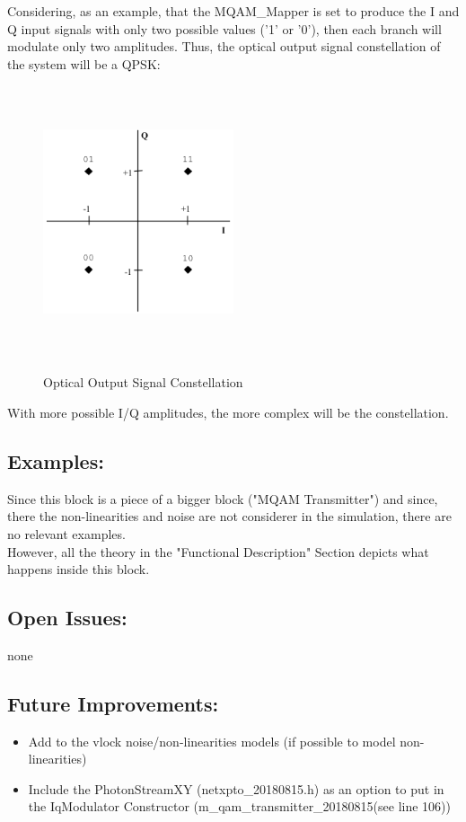 Considering, as an example, that the MQAM\_Mapper is set to produce the I and Q input signals with only  two possible values ('1' or '0'), then each branch will modulate only two amplitudes. Thus, the optical output signal constellation of the system will be a QPSK:
\begin{figure}[H]
	\centering
	\includegraphics[width=0.5\textwidth, height=8cm]{./lib/iq_modulator/figures/qpsk_constellation.png}
	\label{Optical Output Signal Constellation}\caption{Optical Output Signal Constellation}
\end{figure}
With more possible I/Q amplitudes, the more complex will be the constellation.
\subsection*{Examples:}
Since this block is a piece of a bigger block ("MQAM Transmitter") and since, there the non-linearities and noise are not considerer in the simulation, there are no relevant examples.\\
However, all the theory in the "Functional Description" Section depicts what happens inside this block.

\subsection*{Open Issues:}
none
\subsection*{Future Improvements:}
\begin{itemize}
\item Add to the vlock noise/non-linearities models (if possible to model non-linearities)
\item Include the PhotonStreamXY (netxpto\_20180815.h) as an option to put in the IqModulator Constructor (m\_qam\_transmitter\_20180815(see line 106))
\end{itemize}

